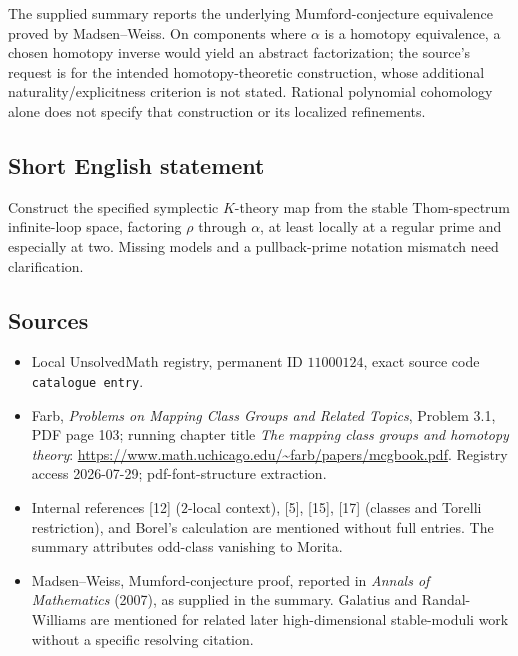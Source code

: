 \documentclass[11pt]{article}
\begin{document}
The supplied summary reports the underlying Mumford-conjecture equivalence proved by Madsen--Weiss. On components where \(\alpha\) is a homotopy equivalence, a chosen homotopy inverse would yield an abstract factorization; the source's request is for the intended homotopy-theoretic construction, whose additional naturality/explicitness criterion is not stated. Rational polynomial cohomology alone does not specify that construction or its localized refinements.
\subsection{Short English statement}
Construct the specified symplectic \(K\)-theory map from the stable Thom-spectrum infinite-loop space, factoring \(\rho\) through \(\alpha\), at least locally at a regular prime and especially at two. Missing models and a pullback-prime notation mismatch need clarification.
\subsection{Sources}
\begin{itemize}
\item Local UnsolvedMath registry, permanent ID \(11000124\), exact source code \texttt{catalogue entry}.
\item Farb, \emph{Problems on Mapping Class Groups and Related Topics}, Problem 3.1, PDF page 103; running chapter title \emph{The mapping class groups and homotopy theory}: \url{https://www.math.uchicago.edu/~farb/papers/mcgbook.pdf}. Registry access 2026-07-29; pdf-font-structure extraction.
\item Internal references [12] (\(2\)-local context), [5], [15], [17] (classes and Torelli restriction), and Borel's calculation are mentioned without full entries. The summary attributes odd-class vanishing to Morita.
\item Madsen--Weiss, Mumford-conjecture proof, reported in \emph{Annals of Mathematics} (2007), as supplied in the summary. Galatius and Randal-Williams are mentioned for related later high-dimensional stable-moduli work without a specific resolving citation.
\end{itemize}
\end{document}
